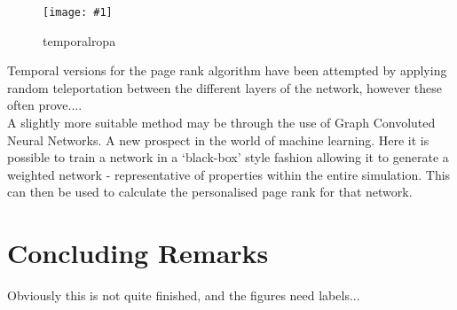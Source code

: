 \documentclass[twoside,reqno]{article}
\newcommand{\qfig}[4]{\begin{figure}[H]\centering\texttt{[image: \#1]}\caption{#3}\label{#2}\end{figure}\newpage}
\begin{document}
\qfig{newfigs/ch2_temporalropa.pdf}{fig:tempropa}{temporalropa}{\textwidth}

Temporal versions for the page rank algorithm have been attempted by applying random teleportation between the different layers of the network, however these often prove.... \\

A slightly more suitable method may be through the use of Graph Convoluted Neural Networks. A new prospect in the world of machine learning. Here it is possible to train a network in a `black-box' style fashion allowing it to generate a weighted network - representative of properties within the entire simulation. This can then be used to calculate the personalised page rank for that network.

\section{Concluding Remarks}
Obviously this is not quite finished, and the figures need labels...

\newpage









% 
\end{document}
